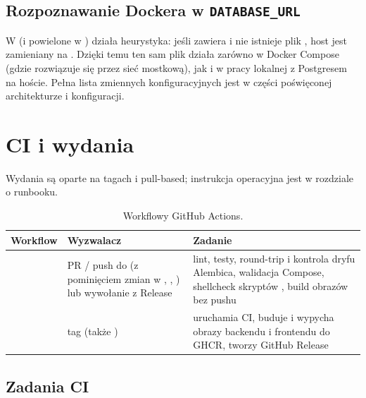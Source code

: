 \subsection{Rozpoznawanie Dockera w \texttt{DATABASE\_URL}}

W  (i powielone w ) działa heurystyka:
jeśli  zawiera  i nie istnieje plik , host
 jest zamieniany na . Dzięki temu ten sam plik 
działa zarówno w Docker Compose (gdzie  rozwiązuje się przez sieć mostkową),
jak i w pracy lokalnej z Postgresem na hoście. Pełna lista zmiennych konfiguracyjnych
jest w części poświęconej architekturze i konfiguracji.

\section{CI i wydania}
\label{sec:op-ci}

Wydania są oparte na tagach i pull-based; instrukcja operacyjna jest w rozdziale o
runbooku.

\begin{table}[H]
\centering\small
\begin{tabularx}{\textwidth}{@{}p{}p{}Y@{}}
\toprule
\textbf{Workflow} & \textbf{Wyzwalacz} & \textbf{Zadanie} \\
\midrule
{} & PR / push do  (z pominięciem zmian w , , ) lub wywołanie z Release & lint, testy, round-trip i kontrola dryfu Alembica, walidacja Compose, shellcheck skryptów , build obrazów bez pushu \\
 & tag  (także ) & uruchamia CI, buduje i wypycha obrazy backendu i frontendu do GHCR, tworzy GitHub Release \\
\bottomrule
\end{tabularx}
\caption{Workflowy GitHub Actions.}
\end{table}

\subsection{Zadania CI}

